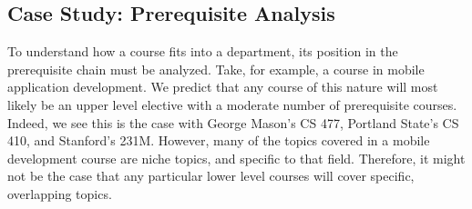 




\subsection{Case Study: Prerequisite Analysis}
\label{sec:eval-prerequisites}


To understand how a course fits into a department, its position in the prerequisite chain must be analyzed.
Take, for example, a course in mobile application development.
We predict that any course of this nature will most likely be an upper level elective with a moderate number of prerequisite courses.
Indeed, we see this is the case with George Mason's CS 477, Portland State's CS 410, and Stanford's 231M.
However, many of the topics covered in a mobile development course are niche topics, and specific to that field.
Therefore, it might not be the case that any particular lower level courses will cover specific, overlapping topics.

